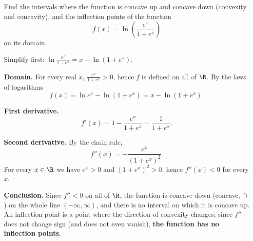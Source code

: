 
\begin{question}
Find the intervals where the function is concave up and concave down (convexity and concavity), and the inflection points of the function
\[ f(x)=\ln\left(\frac{e^x}{1+e^x}\right) \]
on its domain.
\end{question}

\begin{hint}
Simplify first: $\ln\frac{e^x}{1+e^x}=x-\ln(1+e^x)$.
\end{hint}

\begin{solution}
\textbf{Domain.} For every real $x$, $\frac{e^x}{1+e^x}>0$, hence $f$ is defined on all of $\R$. By the laws of logarithms
\[ f(x)=\ln e^x-\ln(1+e^x)=x-\ln(1+e^x). \]

\textbf{First derivative.}
\[ f'(x)=1-\frac{e^x}{1+e^x}=\frac{1}{1+e^x}. \]

\textbf{Second derivative.} By the chain rule,
\[ f''(x)=-\frac{e^x}{(1+e^x)^2}. \]
For every $x\in\R$ we have $e^x>0$ and $(1+e^x)^2>0$, hence $f''(x)<0$ for every $x$.

\textbf{Conclusion.} Since $f''<0$ on all of $\R$, the function is concave down (concave, $\cap$) on the whole line $(-\infty,\infty)$, and there is no interval on which it is concave up. An inflection point is a point where the direction of convexity changes; since $f''$ does not change sign (and does not even vanish), \textbf{the function has no inflection points}.
\end{solution}
